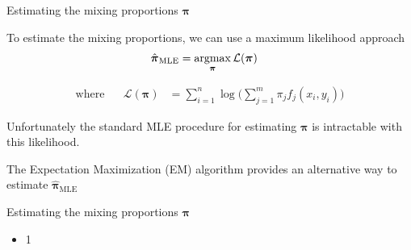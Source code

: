 \documentclass{beamer}
\newcommand{\eqn}[1]{\begin{align*}
#1
\end{align*}}
\newcommand{\vect}[1]{\boldsymbol{\mathbf{#1}}}
\newcommand{\script}[1]{\mathcal{#1}}
\newcommand{\argmax}{\operatornamewithlimits{argmax}}
\newcommand{\leftlbl}[1]{\mbox{#1} \;\;\;\;\;\;}
\newcommand{\vp}{\vect{\pi}}
\newcommand{\vph}{\hat{\vect{\pi}}}
\newcommand{\sumn}{\sum^n_{i=1}}
\newcommand{\summ}{\sum^m_{j=1}}
\newcommand{\fab}{f_j}
\begin{document}
\begin{frame}{Estimating the mixing proportions $\vect{\pi}$}
	
	To estimate the mixing proportions, we can use a maximum likelihood approach
	\eqn{
		\vph_{\text{MLE}} &= \argmax_{\vp} \script{L}(\vect{\pi})
	}
	
	
	
	\eqn{
		\leftlbl{where} \script{L}(\vect{\pi}) &= \sumn \log \Big( \summ \pi_j \fab(x_i,y_i)  \Big)
	}
	
	Unfortunately the standard MLE procedure for estimating $\vp$ is intractable with this likelihood.\newline
	
	The Expectation Maximization (EM) algorithm provides an alternative way to estimate $\vph_{\text{MLE}}$
	
	
	
\end{frame}
\begin{frame}[shrink]{Estimating the mixing proportions $\vect{\pi}$}
	
	\begin{itemize}
		\item 1
	\end{itemize}
	
\end{frame}
\end{document}
